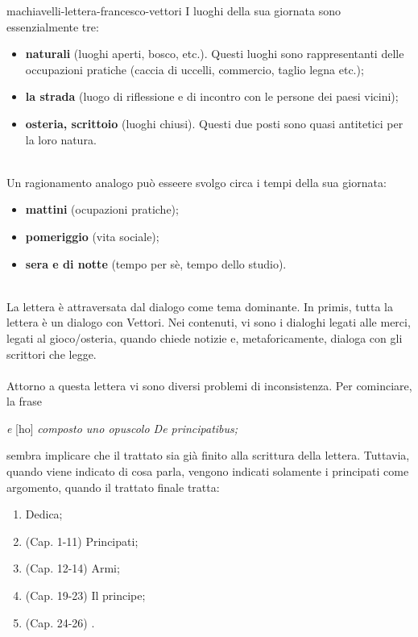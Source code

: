 \documentclass[preview]{standalone}
\begin{document}
\begin{snippet}{machiavelli-lettera-francesco-vettori}
    I luoghi della sua giornata sono essenzialmente tre:
    \begin{itemize}
        \item \textbf{naturali} (luoghi aperti, bosco, etc.).
            Questi luoghi sono rappresentanti delle occupazioni pratiche (caccia di uccelli, commercio, taglio legna etc.);
        \item \textbf{la strada} (luogo di riflessione e di incontro con le persone dei paesi vicini);
        \item \textbf{osteria, scrittoio} (luoghi chiusi). Questi due posti sono quasi antitetici per la loro natura.
    \end{itemize}
    \phantom{}\\
    Un ragionamento analogo può esseere svolgo circa i tempi della sua giornata:
    \begin{itemize}
        \item \textbf{mattini} (ocupazioni pratiche);
        \item \textbf{pomeriggio} (vita sociale);
        \item \textbf{sera e di notte} (tempo per sè, tempo dello studio).
    \end{itemize}
    \phantom{}\\
    La lettera è attraversata dal dialogo come tema dominante.
    In primis, tutta la lettera è un dialogo con Vettori.
    Nei contenuti, vi sono i dialoghi legati alle merci, legati al gioco/osteria,
    quando chiede notizie e, metaforicamente, dialoga con gli scrittori che legge.
    \\\\
    Attorno a questa lettera vi sono diversi problemi di inconsistenza.
    Per cominciare, la frase
    \begin{center}
        \textit{e} [ho] \textit{composto uno opuscolo De principatibus;}
    \end{center}
    sembra implicare che il trattato sia già finito alla scrittura della lettera.
    Tuttavia, quando viene indicato di cosa parla, vengono indicati solamente
    i principati come argomento, quando il trattato finale
    tratta:
    \begin{enumerate}
        \item Dedica;
        \item (Cap. 1-11) Principati;
        \item (Cap. 12-14) Armi;
        \item (Cap. 19-23) Il principe;
        \item (Cap. 24-26) .

\end{enumerate}
\end{snippet}
\end{document}

